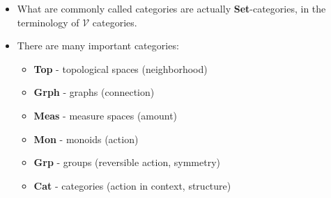 \begin{itemize}
    \item What are commonly called categories are actually \textbf{Set}-categories, in the terminology of $\mathcal{V}$ categories.
    \item There are many important categories:
          \begin{itemize}
            \item \textbf{Top} - topological spaces (neighborhood)
            \item \textbf{Grph} - graphs (connection)
            \item \textbf{Meas} - measure spaces (amount)
            \item \textbf{Mon} - monoids (action)
            \item \textbf{Grp} - groups (reversible action, symmetry)
            \item \textbf{Cat} - categories (action in context, structure)
          \end{itemize}
  \end{itemize}
